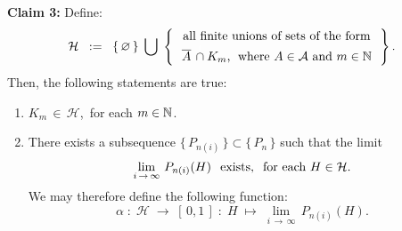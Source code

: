 \vskip 0.5cm
\begin{center}
\begin{minipage}{6.5in}
\textbf{Claim 3:}\quad
Define:
\begin{equation*}
\mathcal{H}
\;\; := \;\;
\left\{\,\varemptyset\,\right\}
\;\bigcup\;
\left\{\,
\begin{array}{c}
\textnormal{all finite unions of sets of the form}
\\
\textnormal{$\overline{A}\,\overset{{\color{white}1}}{\cap}K_{m}$, \;where $A \in \mathcal{A}$ and $m \in \N$}
\end{array}
\,\right\}.
\end{equation*}
Then, the following statements are true:
\begin{enumerate}
\item	$K_{m} \,\in\, \mathcal{H}$,\, for each $m \in \mathbb{N}$.
\item	There exists a subsequence $\{\,P_{n(i)}\,\} \subset \{\,P_{n}\,\}$ such that the limit
		\begin{equation*}
		\lim_{i\,\rightarrow\,\infty}\,P_{n(i)}(H) \;\;\,\textnormal{exists},
		\;\;
		\textnormal{for each $H \in \mathcal{H}$}.
		\end{equation*}
		We may therefore define the following function:
		\begin{equation*}
		\alpha \; : \; \mathcal{H} \;\longrightarrow\; [\,0,1\,] \; : \; H \;\longmapsto\; \lim_{i\,\rightarrow\,\infty}\,P_{n(i)}(H).
		\end{equation*}
\end{enumerate}
\end{minipage}
\end{center}

